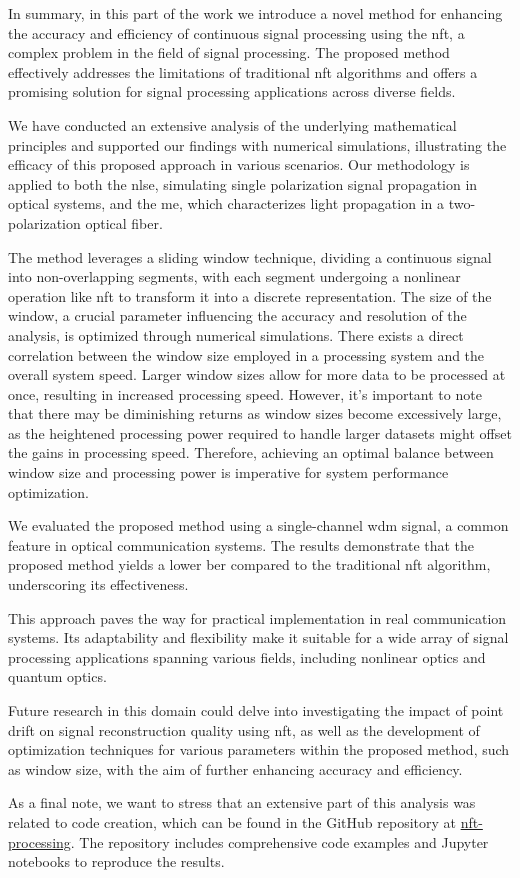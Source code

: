 In summary, in this part of the work we introduce a novel method for enhancing the accuracy and efficiency of continuous signal processing using the \acrlong{nft}, a complex problem in the field of signal processing. The proposed method effectively addresses the limitations of traditional \acrshort{nft} algorithms and offers a promising solution for signal processing applications across diverse fields.

We have conducted an extensive analysis of the underlying mathematical principles and supported our findings with numerical simulations, illustrating the efficacy of this proposed approach in various scenarios. Our methodology is applied to both the \acrlong{nlse}, simulating single polarization signal propagation in optical systems, and the \acrlong{me}, which characterizes light propagation in a two-polarization optical fiber.

The method leverages a sliding window technique, dividing a continuous signal into non-overlapping segments, with each segment undergoing a nonlinear operation like \acrshort{nft} to transform it into a discrete representation. The size of the window, a crucial parameter influencing the accuracy and resolution of the analysis, is optimized through numerical simulations. There exists a direct correlation between the window size employed in a processing system and the overall system speed. Larger window sizes allow for more data to be processed at once, resulting in increased processing speed. However, it's important to note that there may be diminishing returns as window sizes become excessively large, as the heightened processing power required to handle larger datasets might offset the gains in processing speed. Therefore, achieving an optimal balance between window size and processing power is imperative for system performance optimization.

We evaluated the proposed method using a single-channel \acrlong{wdm} signal, a common feature in optical communication systems. The results demonstrate that the proposed method yields a lower \acrlong{ber} compared to the traditional \acrshort{nft} algorithm, underscoring its effectiveness.

This approach paves the way for practical implementation in real communication systems. Its adaptability and flexibility make it suitable for a wide array of signal processing applications spanning various fields, including nonlinear optics and quantum optics.

Future research in this domain could delve into investigating the impact of point drift on signal reconstruction quality using \acrshort{nft}, as well as the development of optimization techniques for various parameters within the proposed method, such as window size, with the aim of further enhancing accuracy and efficiency.

As a final note, we want to stress that an extensive part of this analysis was related to code creation, which can be found in the GitHub repository at \href{https://github.com/esf0/nft-processing}{nft-processing}. The repository includes comprehensive code examples and Jupyter notebooks to reproduce the results.